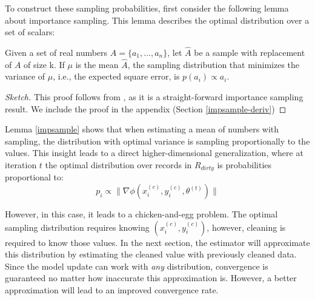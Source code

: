 To construct these sampling probabilities, first consider the following lemma about importance sampling.
This lemma describes the optimal distribution over a set of scalars:
\begin{lemma}\label{impsample}
Given a set of real numbers $A = \{a_1,...,a_n\}$, let $\hat{A}$ be 
a sample with replacement of $A$ of size k.
If $\mu$ is the mean $\hat{A}$, the sampling distribution that minimizes
 the variance of $\mu$, i.e., the expected square error, is $p(a_i) \propto a_i$.
\end{lemma}
\begin{proof}[Sketch]
This proof follows from \cite{mcbook}, as it is a straight-forward importance sampling result.
We include the proof in the appendix (Section \ref{impsample-deriv})
\end{proof}

Lemma \ref{impsample} shows that when estimating a mean of numbers with sampling, the distribution with optimal variance is sampling proportionally to the values.
This insight leads to a direct higher-dimensional generalization, where at iteration $t$ the optimal distribution over records in $R_{dirty}$ is probabilities proportional to:
\[
p_i \propto \|\nabla\phi(x^{(c)}_i,y^{(c)}_i,\theta^{(t)})\|
\]

However, in this case, it leads to a chicken-and-egg problem.
The optimal sampling distribution requires knowing $(x^{(c)}_i,y^{(c)}_i)$, however, cleaning is required to know those values.
In the next section, the estimator will approximate this distribution by estimating the cleaned value with previously cleaned data.
Since the model update can work with \emph{any} distribution, convergence is guaranteed no matter how inaccurate this approximation is.
However, a better approximation will lead to an improved convergence rate.
